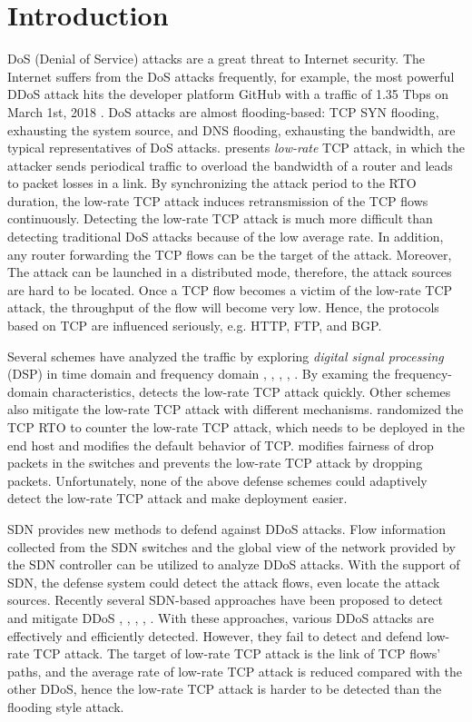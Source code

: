 \documentclass[conference]{IEEEtran}
\begin{document}
\section{Introduction}
DoS (Denial of Service) attacks are a great threat to Internet security. The Internet suffers from the DoS attacks frequently, for example, the most powerful DDoS attack hits the developer platform GitHub with a traffic of 1.35 Tbps on March 1st, 2018 \cite{b19}. DoS attacks are almost flooding-based: TCP SYN flooding, exhausting the system source, and DNS flooding, exhausting the bandwidth, are typical representatives of DoS attacks. \cite{b20} presents \emph{low-rate} TCP attack, in which the attacker sends periodical traffic to overload the bandwidth of a router and leads to packet losses in a link. By synchronizing the attack period to the RTO duration, the low-rate TCP attack induces retransmission of the TCP flows continuously. Detecting the low-rate TCP attack is much more difficult than detecting traditional DoS attacks because of the low average rate. In addition, any router forwarding the TCP flows can be the target of the attack. Moreover, The attack can be launched in a distributed mode, therefore, the attack sources are hard to be located. Once a TCP flow becomes a victim of the low-rate TCP attack, the throughput of the flow will become very low. Hence, the protocols based on TCP are influenced seriously, e.g. HTTP, FTP, and BGP.

Several schemes have analyzed the traffic by exploring \emph{digital signal processing} (DSP) in time domain and frequency domain \cite{b6}, \cite{b7}, \cite{b4}, \cite{b22}, \cite{b1}. By examing the frequency-domain characteristics, \cite{b3} detects the low-rate TCP attack quickly. Other schemes also mitigate the low-rate TCP attack with different mechanisms. \cite{b17} randomized the TCP RTO to counter the low-rate TCP attack, which needs to be deployed in the end host and modifies the default behavior of TCP. \cite{b8} modifies fairness of drop packets in the switches and prevents the low-rate TCP attack by dropping packets. Unfortunately, none of the above defense schemes could adaptively detect the low-rate TCP attack and make deployment easier.

SDN provides new methods to defend against DDoS attacks. Flow information collected from the SDN switches and the global view of the network provided by the SDN controller can be utilized to analyze DDoS attacks. With the support of SDN, the defense system could detect the attack flows, even locate the attack sources. Recently several SDN-based approaches have been proposed to detect and mitigate DDoS \cite{b9}, \cite{b16}, \cite{b11}, \cite{b23}, \cite{b24}. With these approaches, various DDoS attacks are effectively and efficiently detected. However, they fail to detect and defend low-rate TCP attack. The target of low-rate TCP attack is the link of TCP flows' paths, and the average rate of low-rate TCP attack is reduced compared with the other DDoS, hence the low-rate TCP attack is harder to be detected than the flooding style attack.
\end{document}

